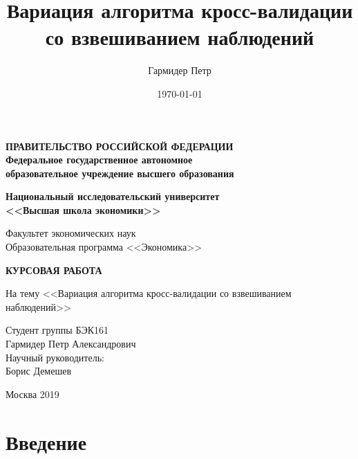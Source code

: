 \documentclass[a4paper, 14pt]{article}
\title{Вариация алгоритма кросс-валидации со взвешиванием наблюдений}
\author{Гармидер Петр}
\date{\today}
\begin{document}
\thispagestyle{empty}
\begin{center}
	\textbf{ПРАВИТЕЛЬСТВО РОССИЙСКОЙ ФЕДЕРАЦИИ}\\
	\vspace{2ex}
	\textbf{Федеральное государственное автономное\\ образовательное учреждение высшего образования}
	
	\vspace{2ex}
	
	\textbf{Национальный исследовательский университет \\ <<Высшая школа экономики>>}
	
	\vspace{8ex}
	\begin{flushright}
		Факультет экономических наук\\
		Образовательная программа <<Экономика>>
	\end{flushright}
\end{center}
\vspace{9ex}

\begin{center}
	{\textbf{КУРСОВАЯ РАБОТА
	}}
	\vspace{1ex}
	
	На тему <<Вариация алгоритма кросс-валидации со взвешиванием наблюдений>>
\end{center}
\vspace{1ex}
\begin{flushright}
	\noindent
	Студент группы БЭК161\\Гармидер Петр Александрович\\
	\vspace{13ex}
	Научный руководитель:\\
	Борис Демешев
	
\end{flushright}	

\vfill

\begin{center}
	Москва 2019
	
\end{center}
\newpage

\tableofcontents

\newpage

\section{Введение}
\end{document}
